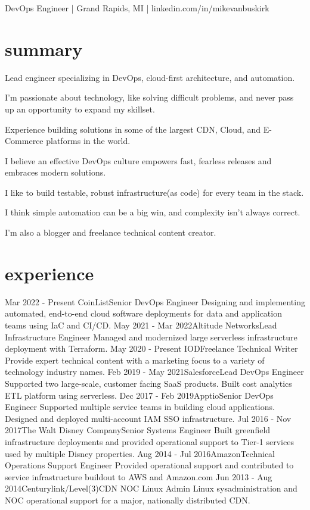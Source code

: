 \documentclass[]{mv_cv}
\begin{document}
       {DevOps Engineer | Grand Rapids, MI | linkedin.com/in/mikevanbuskirk}
 
\section{summary}
\begin{content}
  {
Lead engineer specializing in DevOps, cloud-first architecture, and automation.

I'm passionate about technology, like solving difficult problems, and never pass up an opportunity to expand my skillset.

Experience building solutions in some of the largest CDN, Cloud, and E-Commerce platforms in the world.

I believe an effective DevOps culture empowers fast, fearless releases and embraces modern solutions.

I like to build testable, robust infrastructure(as code) for every team in the stack.

I think simple automation can be a big win, and complexity isn't always correct.

I'm also a blogger and freelance technical content creator.
  }
\end{content}

\section{experience}
  \begin{explist}
    \expitem
    {Mar 2022 - Present  }{CoinList}{Senior DevOps Engineer}
    {Designing and implementing automated, end-to-end cloud software deployments for data and application teams using IaC and CI/CD.}
    \expitem
    {May 2021 - Mar 2022}{Altitude Networks}{Lead Infrastructure Engineer}
    {Managed and modernized large serverless infrastructure deployment with Terraform.}
    \expitem
    {May 2020 - Present  }{IOD}{Freelance Technical Writer}
    {Provide expert technical content with a marketing focus to a variety of technology industry names.}
    \expitem
    {Feb 2019 - May 2021}{Salesforce}{Lead DevOps Engineer}
    {Supported two large-scale, customer facing SaaS products. Built cost analytics ETL platform using serverless.}
    \expitem
    {Dec 2017 - Feb 2019}{Apptio}{Senior DevOps Engineer}
    {Supported multiple service teams in building cloud applications. Designed and deployed multi-account IAM SSO infrastructure.}
    \expitem
    {Jul 2016 - Nov 2017}{The Walt Disney Company}{Senior Systems Engineer}
    {Built greenfield infrastructure deployments and provided operational support to Tier-1 services used by multiple Disney properties.}
    \expitem
    {Aug 2014 - Jul 2016}{Amazon}{Technical Operations Support Engineer}
    {Provided operational support and contributed to service infrastructure buildout to AWS and Amazon.com}
   \expitem
    {Jun 2013 - Aug 2014}{Centurylink/Level(3)}{CDN NOC Linux Admin}
    {Linux sysadministration and NOC operational support for a major, nationally distributed CDN.}
  \end{explist}
\end{document}
